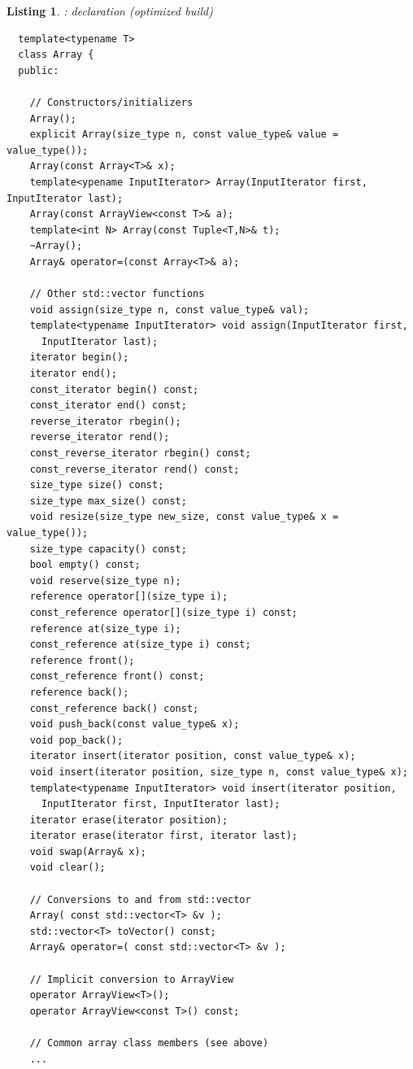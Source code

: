 \documentclass[pdf,ps2pdf,11pt]{SANDreport}
\newtheorem{listing}{Listing}
\begin{document}
\begin{listing}: {} declaration (optimized build) \\
\label{listing:Array}
{\small\begin{verbatim}
  template<typename T>
  class Array {
  public:
  
    // Constructors/initializers
    Array();
    explicit Array(size_type n, const value_type& value = value_type());
    Array(const Array<T>& x);
    template<ypename InputIterator> Array(InputIterator first, InputIterator last);
    Array(const ArrayView<const T>& a);
    template<int N> Array(const Tuple<T,N>& t);
    ~Array();
    Array& operator=(const Array<T>& a);
  
    // Other std::vector functions
    void assign(size_type n, const value_type& val);
    template<typename InputIterator> void assign(InputIterator first,
      InputIterator last);
    iterator begin();
    iterator end();
    const_iterator begin() const;
    const_iterator end() const;
    reverse_iterator rbegin();
    reverse_iterator rend();
    const_reverse_iterator rbegin() const;
    const_reverse_iterator rend() const;
    size_type size() const;
    size_type max_size() const;
    void resize(size_type new_size, const value_type& x = value_type());
    size_type capacity() const;
    bool empty() const;
    void reserve(size_type n);
    reference operator[](size_type i);
    const_reference operator[](size_type i) const;
    reference at(size_type i);
    const_reference at(size_type i) const;
    reference front();
    const_reference front() const;
    reference back();
    const_reference back() const;
    void push_back(const value_type& x);
    void pop_back();
    iterator insert(iterator position, const value_type& x);
    void insert(iterator position, size_type n, const value_type& x);
    template<typename InputIterator> void insert(iterator position,
      InputIterator first, InputIterator last);
    iterator erase(iterator position);
    iterator erase(iterator first, iterator last);
    void swap(Array& x);
    void clear();
  
    // Conversions to and from std::vector
    Array( const std::vector<T> &v );
    std::vector<T> toVector() const;
    Array& operator=( const std::vector<T> &v );

    // Implicit conversion to ArrayView
    operator ArrayView<T>();
    operator ArrayView<const T>() const;
  
    // Common array class members (see above)
    ...
  

\end{verbatim}}
\end{listing}
\end{document}
